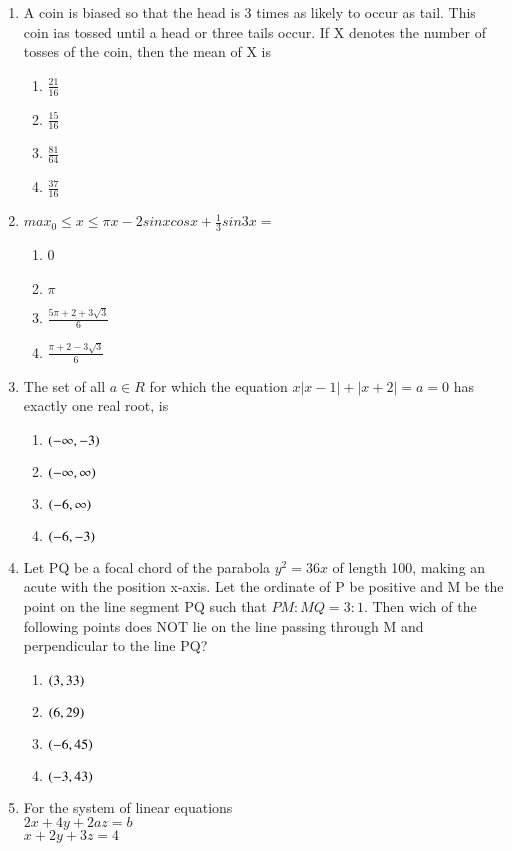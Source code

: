 \documentclass[journal,12pt,onecolumn]{IEEEtran}
\theoremstyle{remark}
\begin{document}
\begin{enumerate}
\item A coin is biased so that the head is 3 times as likely to occur as tail. This coin ias tossed until a head or three tails occur. If X denotes the number of tosses of the coin, then the mean of X is 
\begin{enumerate}
    \item $\frac{21}{16}$
    \item $\frac{15}{16}$
    \item $\frac{81}{64}$
    \item $\frac{37}{16}$
\end{enumerate}
\item $max_0 \leq x\leq \pi{x-2sinxcosx+ \frac{1}{3}sin3x}=$
\begin{enumerate}
    \item 0
    \item $\pi$
    \item $\frac{5\pi+2+3\sqrt{3}}{6}$
    \item $\frac{\pi+2-3\sqrt{3}}{6}$
\end{enumerate}
\item The set of all $a \in R$ for which the equation $x|x-1| + |x+2| = a =0$ has exactly one real root, is
\begin{enumerate}
    \item $\left(-\infty,-3\right)$
    \item $\left(-\infty,\infty\right)$
    \item $\left(-6,\infty\right)$
    \item $\left(-6,-3\right)$
\end{enumerate}
\item Let PQ be a focal chord of the parabola $y^2 = 36x$ of length 100, making an acute with the position x-axis. Let the ordinate of P be positive and M be the point on the line segment PQ such that $PM:MQ=3:1$. Then wich of the following points does NOT lie on the line passing through M and perpendicular to the line PQ? 
\begin{enumerate}
    \item $\left(3,33\right)$
    \item $\left(6,29\right)$
    \item $\left(-6,45\right)$
    \item $\left(-3,43\right)$
\end{enumerate}
\item For the system of linear equations\\
$2x + 4y + 2az = b$\\
$x +  2y + 3z = 4$\\

\end{enumerate}
\end{document}
